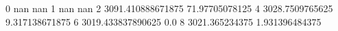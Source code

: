 0 nan nan
1 nan nan
2 3091.410888671875 71.97705078125
4 3028.7509765625 9.317138671875
6 3019.433837890625 0.0
8 3021.365234375 1.931396484375
